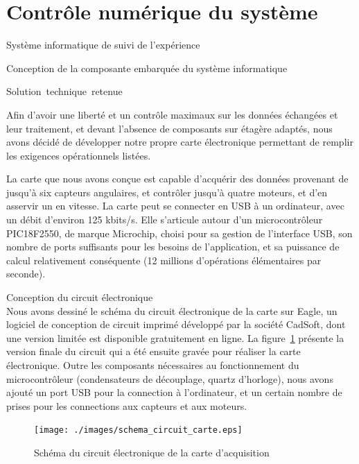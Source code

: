 \documentclass[a4paper,twoside,12pt]{article}
\newcounter{partie}
\newcounter{sous-partie}
\newenvironment{partie}[1]
{
\section{#1}
}
{

}
\newenvironment{sous-partie}[1]
{
\subsection{#1}
}
{

}
\newenvironment{sous-sous-partie}[1]
{
\subsubsection{#1}
}
{

}
\begin{document}
\begin{partie}{Contrôle numérique du système}
\begin{sous-partie}{Système informatique de suivi de l'expérience}
\begin{sous-sous-partie}{Conception de la composante embarquée du système informatique}
\begin{paragraph}{\mbox{Solution technique retenue\vspace{0.3cm}\\}}
\begin{subparagraph}{}
Afin d'avoir une liberté et un contrôle maximaux sur les données échangées et leur traitement, et devant l'absence de composants sur étagère adaptés, nous avons décidé de développer notre propre carte électronique permettant de remplir les exigences opérationnels listées.
\end{subparagraph}

\begin{subparagraph}{}
La carte que nous avons conçue est capable d'acquérir des données provenant de jusqu'à six capteurs angulaires, et contrôler jusqu'à quatre moteurs, et d'en asservir un en vitesse. %
La carte peut se connecter en USB à un ordinateur, avec un débit d'environ 125 kbits/s. %
Elle s'articule autour d'un microcontrôleur PIC18F2550, de marque Microchip, choisi pour sa gestion de l'interface USB, son nombre de ports suffisants pour les besoins de l'application, et sa puissance de calcul relativement conséquente (12 millions d'opérations élémentaires par seconde).
\end{subparagraph}
\end{paragraph}

\begin{paragraph}{Conception du circuit électronique\vspace{0.3cm}\\}
Nous avons dessiné le schéma du circuit électronique de la carte sur Eagle, un logiciel de conception de circuit imprimé développé par la société CadSoft, dont une version limitée est disponible gratuitement en ligne. %
La figure~\ref{schemaCircuitCarte} présente la version finale du circuit qui a été ensuite gravée pour réaliser la carte électronique. %
Outre les composants nécessaires au fonctionnement du microcontrôleur (condensateurs de découplage, quartz d'horloge), nous avons ajouté un port USB pour la connection à l'ordinateur, et un certain nombre de prises pour les connections aux capteurs et aux moteurs.
\end{paragraph}

\begin{figure}[hbt]
	\centering
	\texttt{[image: ./images/schema\_circuit\_carte.eps]}
	\caption{Schéma du circuit électronique de la carte d'acquisition}
	\label{schemaCircuitCarte}
\end{figure}


\end{sous-sous-partie}
\end{sous-partie}
\end{partie}
\end{document}

